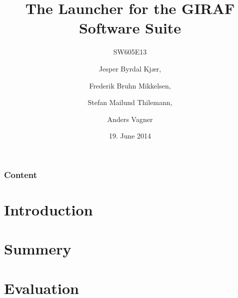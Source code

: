 \documentclass{beamer}
\title[The Launcher for the GIRAF Software Suite]{The Launcher for the GIRAF Software Suite}
\subtitle{SW605E13}
\author[SW605E13]{Jesper Byrdal Kj\ae r, \and Frederik Bruhn Mikkelsen, \and Stefan Mailund Thilemann, \and Anders Vagner}
\institute[Aalborg University]
{
  Department of Computer Science\\
  Aalborg University}
\date[CFP 2003]{19. June 2014}
\begin{document}

\begin{frame}
  \titlepage
\end{frame}

\begin{frame}
    \frametitle{Content}
    \tableofcontents[sectionstyle=show/show,subsectionstyle=hide/hide/hide]
\end{frame}

\section{Introduction}


\section{Summery}



\section{Evaluation}

\end{document}
